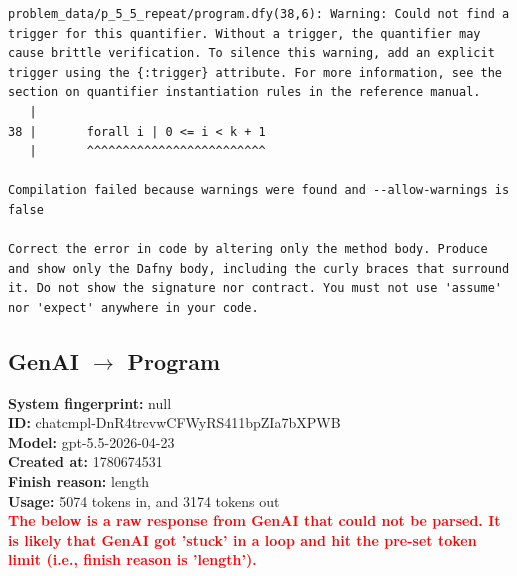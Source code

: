 \documentclass{article}
\begin{document}
\begin{lstlisting}
problem_data/p_5_5_repeat/program.dfy(38,6): Warning: Could not find a trigger for this quantifier. Without a trigger, the quantifier may cause brittle verification. To silence this warning, add an explicit trigger using the {:trigger} attribute. For more information, see the section on quantifier instantiation rules in the reference manual.
   |
38 |       forall i | 0 <= i < k + 1
   |       ^^^^^^^^^^^^^^^^^^^^^^^^^

Compilation failed because warnings were found and --allow-warnings is false

Correct the error in code by altering only the method body. Produce and show only the Dafny body, including the curly braces that surround it. Do not show the signature nor contract. You must not use 'assume' nor 'expect' anywhere in your code.
\end{lstlisting}
\subsection*{GenAI $\rightarrow$ Program}
\textbf{System fingerprint: }null
\\\textbf{ID: }chatcmpl-DnR4trcvwCFWyRS411bpZIa7bXPWB
\\\textbf{Model: }gpt-5.5-2026-04-23
\\\textbf{Created at: }1780674531
\\\textbf{Finish reason: }length
\\\textbf{Usage: }5074 tokens in, and 3174 tokens out
\\\textcolor{red}{\textbf{The below is a raw response from GenAI that could not be parsed. It is likely that GenAI got 'stuck' in a loop and hit the pre-set token limit (i.e., finish reason is 'length').}}
\begin{lstlisting}

\end{lstlisting}
\end{document}
